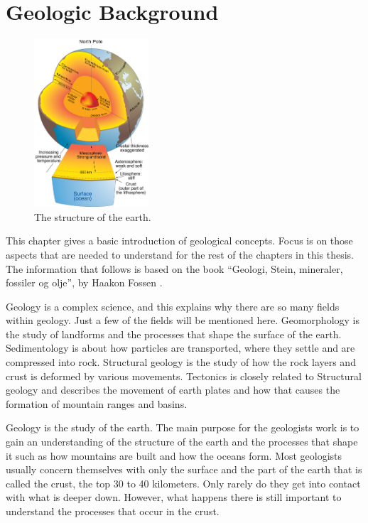 \documentclass[a4paper,12pt]{report}
\begin{document}
\chapter{Geologic Background}
\label{sec:geology}
\begin{figure}
  \begin{center}
    \includegraphics[width=0.38\textwidth]{thesis/geo/english/indre.jpg}
  \end{center}
  \caption{The structure of the earth.}
  \label{fig:core}
\end{figure}
This chapter gives a basic introduction of geological concepts. Focus is on those aspects that are needed to understand for the rest of the chapters in this thesis. The information that follows is based on the book ``Geologi, Stein, mineraler, fossiler og olje'', by Haakon Fossen \cite{fossen2008geologi}.

Geology is a complex science, and this explains why there are so many fields within geology. Just a few of the fields will be mentioned here. Geomorphology is the study of landforms and the processes that shape the surface of the earth. Sedimentology is about how particles are transported, where they settle and are compressed into rock. Structural geology is the study of how the rock layers and crust is deformed by various movements. Tectonics is closely related to Structural geology and describes the movement of earth plates and how that causes the formation of mountain ranges and basins.

Geology is the study of the earth. The main purpose for the geologists work is to gain an understanding of the structure of the earth and the processes that shape it such as how mountains are built and how the oceans form. Most geologists usually concern themselves with only the surface and the part of the earth that is called the crust, the top 30 to 40 kilometers. Only rarely do they get into contact with what is deeper down. However, what happens there is still important to understand the processes that occur in the crust. 
\end{document}
